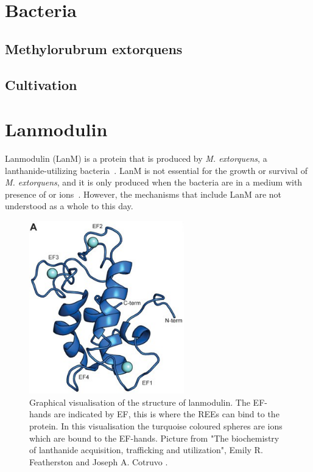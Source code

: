 \section{Bacteria\authorB{}}

\subsection{Methylorubrum extorquens}

\subsection{Cultivation}


\section{Lanmodulin\authorA}

Lanmodulin (LanM) is a protein that is produced by \textit{M. extorquens}, a lanthanide-utilizing bacteria~\cite{lanmdiscovery}.
LanM is not essential for the growth or survival of \textit{M. extorquens}, and it is only produced when the bacteria are in a medium with presence of  or  ions~\cite{lanmroleinbiology}.
However, the mechanisms that include LanM are not understood as a whole to this day.

\begin{figure}[H]
    \centering
    \includegraphics[width=0.6\textwidth]{./media/images/lanm_structure}
    \caption{Graphical visualisation of the structure of lanmodulin. The EF-hands are indicated by EF, this is where the REEs can bind to the protein. In this visualisation the turquoise coloured spheres are  ions which are bound to the EF-hands. Picture from "The biochemistry of lanthanide acquisition, trafficking and utilization", Emily R. Featherston and Joseph A. Cotruvo \cite{lanmroleinbiology}.}
    \label{fig:lanm_structure}
\end{figure}


